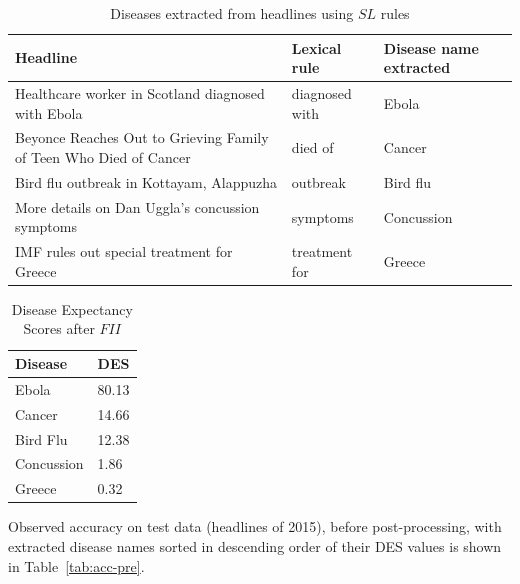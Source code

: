 \documentclass{article}
\begin{document}
\begin{table}[h]
  \caption{Diseases extracted from headlines using $SL$ rules}
  \centering
  \begin{tabular}{|p{4cm}|p{2cm}|p{1.5cm}|} \hline
  \label{tab:dis-headlines}
  \textbf{Headline} & \textbf{Lexical rule} & \textbf{Disease name extracted} \\ \hline
  Healthcare worker in Scotland diagnosed with Ebola & diagnosed with & Ebola \\ \hline
  Beyonce Reaches Out to Grieving Family of Teen Who Died of Cancer & died of & Cancer \\ \hline
  Bird flu outbreak in Kottayam, Alappuzha & outbreak & Bird flu \\ \hline
  
   More details on Dan Uggla's concussion symptoms & symptoms & Concussion \\ \hline
  IMF rules out special treatment for Greece & treatment for & Greece \\ \hline
 
  
  \end{tabular}
\end{table}

\begin{table}[h]
  \caption{Disease Expectancy Scores after $FII$}
  \centering
  \begin{tabular}{|l|l|} \hline
  \label{tab:dis-DES}
  \textbf{Disease} & \textbf{DES} \\ \hline
  Ebola & 80.13 \\ \hline  
  Cancer & 14.66 \\ \hline  
  Bird Flu & 12.38 \\ \hline  
  Concussion & 1.86 \\ \hline  
  Greece & 0.32 \\ \hline
  
  \end{tabular}
\end{table}

Observed accuracy on test data (headlines of 2015), before post-processing, with extracted disease names sorted in descending order of their DES values is shown in Table~\ref{tab:acc-pre}.
\end{document}
